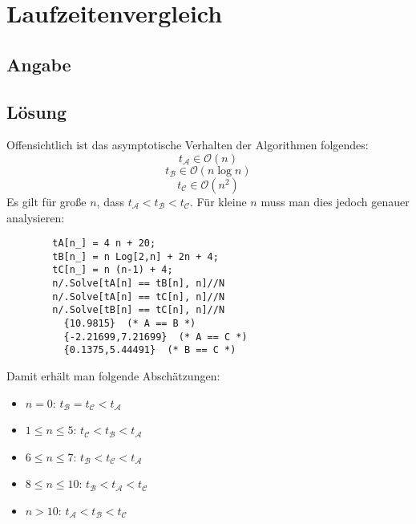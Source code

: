 \section*{Laufzeitenvergleich}
\subsection*{Angabe}


\subsection*{Lösung}

\begin{flushenum}
\item
	Offensichtlich ist das asymptotische Verhalten der Algorithmen folgendes:
	\[ t_\mathcal{A} \in \mathcal{O}(n) \]
	\[ t_\mathcal{B} \in \mathcal{O}(n \log n) \]
	\[ t_\mathcal{C} \in \mathcal{O}(n^2) \]
	Es gilt für große $n$, dass $t_\mathcal{A} < t_\mathcal{B} < t_\mathcal{C}$.
	Für kleine $n$ muss man dies jedoch genauer analysieren:
	\lstset{language=Mathematica}
	\begin{lstlisting}
		tA[n_] = 4 n + 20;
		tB[n_] = n Log[2,n] + 2n + 4;
		tC[n_] = n (n-1) + 4;
		n/.Solve[tA[n] == tB[n], n]//N
		n/.Solve[tA[n] == tC[n], n]//N
		n/.Solve[tB[n] == tC[n], n]//N
		  {10.9815}  (* A == B *)
		  {-2.21699,7.21699}  (* A == C *)
		  {0.1375,5.44491}  (* B == C *)
	\end{lstlisting}
	Damit erhält man folgende Abschätzungen:
	\begin{itemize}
		\item $n=0$: $t_\mathcal{B} = t_\mathcal{C} < t_\mathcal{A}$
		\item $1 \leq n \leq 5$: $t_\mathcal{C} < t_\mathcal{B} < t_\mathcal{A}$
		\item $6 \leq n \leq 7$: $t_\mathcal{B} < t_\mathcal{C} < t_\mathcal{A}$
		\item $8 \leq n \leq 10$: $t_\mathcal{B} < t_\mathcal{A} < t_\mathcal{C}$
		\item $n > 10$: $t_\mathcal{A} < t_\mathcal{B} < t_\mathcal{C}$
	\end{itemize}


\end{flushenum}
